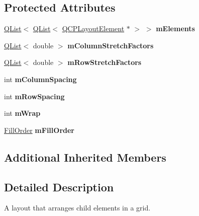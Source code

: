 \subsection*{Protected Attributes}
\begin{DoxyCompactItemize}
\item 
\mbox{\label{class_q_c_p_layout_grid_a88fddf7fc3ee0369c36d6dd65596d534}} 
\hyperlink{class_q_list}{Q\+List}$<$ \hyperlink{class_q_list}{Q\+List}$<$ \hyperlink{class_q_c_p_layout_element}{Q\+C\+P\+Layout\+Element} $\ast$ $>$ $>$ {\bfseries m\+Elements}
\item 
\mbox{\label{class_q_c_p_layout_grid_a9f588eada89ff288965f5e46db2a70ab}} 
\hyperlink{class_q_list}{Q\+List}$<$ double $>$ {\bfseries m\+Column\+Stretch\+Factors}
\item 
\mbox{\label{class_q_c_p_layout_grid_af8c1afff6c31b4062876c8d29fa2ad44}} 
\hyperlink{class_q_list}{Q\+List}$<$ double $>$ {\bfseries m\+Row\+Stretch\+Factors}
\item 
\mbox{\label{class_q_c_p_layout_grid_ae9ac48f0791be07ead0a96dbd5622770}} 
int {\bfseries m\+Column\+Spacing}
\item 
\mbox{\label{class_q_c_p_layout_grid_a8b67f183f4645739cc4c794d75843b40}} 
int {\bfseries m\+Row\+Spacing}
\item 
\mbox{\label{class_q_c_p_layout_grid_a17d90c289139847f68cca9e75d64b0fd}} 
int {\bfseries m\+Wrap}
\item 
\mbox{\label{class_q_c_p_layout_grid_a35a20072cbca5659dd75ca74eae87beb}} 
\hyperlink{class_q_c_p_layout_grid_a7d49ee08773de6b2fd246edfed353cca}{Fill\+Order} {\bfseries m\+Fill\+Order}
\end{DoxyCompactItemize}
\subsection*{Additional Inherited Members}


\subsection{Detailed Description}
A layout that arranges child elements in a grid. 

